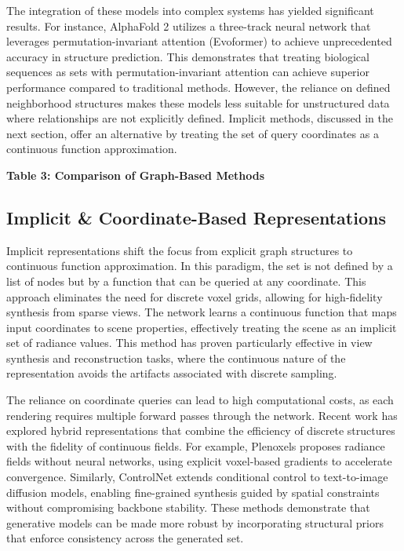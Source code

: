 \documentclass{article}
\begin{document}
The integration of these models into complex systems has yielded significant results. For instance, AlphaFold 2 utilizes a three-track neural network that leverages permutation-invariant attention (Evoformer) to achieve unprecedented accuracy in structure prediction. This demonstrates that treating biological sequences as sets with permutation-invariant attention can achieve superior performance compared to traditional methods. However, the reliance on defined neighborhood structures makes these models less suitable for unstructured data where relationships are not explicitly defined. Implicit methods, discussed in the next section, offer an alternative by treating the set of query coordinates as a continuous function approximation.

\textbf{Table 3: Comparison of Graph-Based Methods}

\subsection{Implicit \& Coordinate-Based Representations}

\label{sec:implicit_coordinate_based_representation}

Implicit representations shift the focus from explicit graph structures to continuous function approximation. In this paradigm, the set is not defined by a list of nodes but by a function that can be queried at any coordinate. This approach eliminates the need for discrete voxel grids, allowing for high-fidelity synthesis from sparse views. The network learns a continuous function that maps input coordinates to scene properties, effectively treating the scene as an implicit set of radiance values. This method has proven particularly effective in view synthesis and reconstruction tasks, where the continuous nature of the representation avoids the artifacts associated with discrete sampling.

The reliance on coordinate queries can lead to high computational costs, as each rendering requires multiple forward passes through the network. Recent work has explored hybrid representations that combine the efficiency of discrete structures with the fidelity of continuous fields. For example, Plenoxels proposes radiance fields without neural networks, using explicit voxel-based gradients to accelerate convergence. Similarly, ControlNet extends conditional control to text-to-image diffusion models, enabling fine-grained synthesis guided by spatial constraints without compromising backbone stability. These methods demonstrate that generative models can be made more robust by incorporating structural priors that enforce consistency across the generated set.
\end{document}
